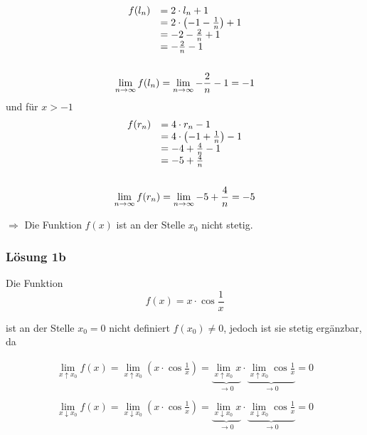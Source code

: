 \documentclass[main.tex]{subfiles}
\begin{document}
\begin{gather*}
    \begin{array}{ c l }
        f( l_{n}) & =2\cdotp l_{n} +1\\
        & =2\cdotp \left( -1-\frac{1}{n}\right) +1\\
        & =-2-\frac{2}{n} +1\\
        & =-\frac{2}{n} -1
    \end{array}\\
    \\
    \lim_{n\rightarrow\infty} f (l_{n}) =\lim_{n\rightarrow\infty} -\frac{2}{n} -1=-1
\end{gather*}
und für $x >-1$
\begin{gather*}
    \begin{array}{ c l }
        f( r_{n}) & =4\cdotp r_{n} -1\\
        & =4\cdotp \left( -1+\frac{1}{n}\right) -1\\
        & =-4+\frac{4}{n} -1\\
        & =-5+\frac{4}{n}
    \end{array}\\
    \\
    \lim_{n\rightarrow\infty} f (r_{n}) =\lim_{n\rightarrow\infty} -5+\frac{4}{n} =-5
\end{gather*}


$\Rightarrow$ Die Funktion $f(x)$ ist an der Stelle $x_{0}$ nicht stetig.

\subsubsection{Lösung 1b}

Die Funktion
\begin{equation*}
    f (x) =x\cdotp \cos\frac{1}{x}
\end{equation*}

ist an der Stelle $x_{0} =0$ nicht definiert $f(x_{0}) \neq 0$, jedoch ist sie stetig ergänzbar, da

\begin{gather*}
    \lim _{x\uparrow x_{0}} f( x) =\lim _{x\uparrow x_{0}}\left( x\cdotp \cos\frac{1}{x}\right) =\underbrace{\lim\limits _{x\uparrow x_{0}} x}_{\rightarrow 0} \cdot \underbrace{\lim\limits _{x\uparrow x_{0}}\cos\frac{1}{x}}_{\rightarrow 0} =0\\
    \\
    \lim _{x\downarrow x_{0}} f( x) =\lim _{x\downarrow x_{0}}\left( x\cdotp \cos\frac{1}{x}\right) =\underbrace{\lim\limits _{x\downarrow x_{0}} x}_{\rightarrow 0} \cdot \underbrace{\lim\limits _{x\downarrow x_{0}}\cos\frac{1}{x}}_{\rightarrow 0} =0
\end{gather*}
\end{document}
